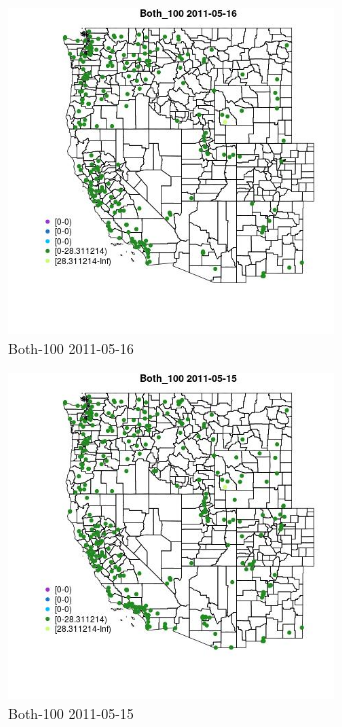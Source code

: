 \begin{figure} 
\centering  
\includegraphics[width=0.77\textwidth]{Code_Outputs/ML_input_report_ML_input_PM25_Step5_part_d_de_duplicated_aves_ML_input_MapObsBoth_1002011-05-16.jpg} 
\caption{\label{fig:ML_input_report_ML_input_PM25_Step5_part_d_de_duplicated_aves_ML_inputMapObsBoth_1002011-05-16}Both-100 2011-05-16} 
\end{figure} 
 

\begin{figure} 
\centering  
\includegraphics[width=0.77\textwidth]{Code_Outputs/ML_input_report_ML_input_PM25_Step5_part_d_de_duplicated_aves_ML_input_MapObsBoth_1002011-05-15.jpg} 
\caption{\label{fig:ML_input_report_ML_input_PM25_Step5_part_d_de_duplicated_aves_ML_inputMapObsBoth_1002011-05-15}Both-100 2011-05-15} 
\end{figure} 
 

